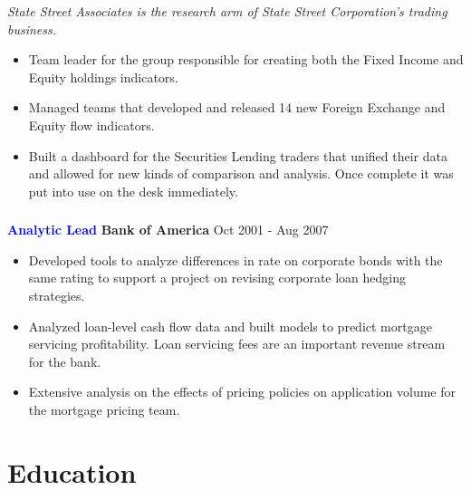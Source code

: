 \documentclass[10pt, letterpaper]{article} %
\providecommand{\tightlist}{%
  \setlength{\itemsep}{0pt}\setlength{\parskip}{0pt}}
\begin{document}
{{\vspace{-4pt}
{\hspace{0.1in} \footnotesize \emph{State Street Associates is the research arm of State Street Corporation's trading business.}}

\vspace{-8pt}

  \begin{itemize}
  \tightlist
  \item Team leader for the group responsible 
    for creating both the Fixed Income and Equity holdings indicators.
  \item Managed teams that developed and released 14 new Foreign Exchange and    Equity flow indicators.
  \item Built a
  dashboard for the Securities Lending traders that unified their data and
  allowed for new kinds of comparison and analysis.
   Once complete it was put into use on the desk immediately.    
  \end{itemize}

\vspace{-20pt}
\hypertarget{bofa}{\subsubsection{}\label{bofa}}
\textbf {\textcolor{blue}{Analytic Lead}} \hfill  
 \textbf{Bank of America} \hfill 
Oct 2001 -  Aug 2007

  \begin{itemize}
  \tightlist
  \item Developed tools to analyze differences in rate on corporate bonds with the same rating to support a project on revising corporate loan hedging strategies.

  \item Analyzed loan-level cash flow data and built models to predict     mortgage servicing profitability. Loan servicing fees are an important revenue stream for the bank.
  
  \item Extensive analysis on the effects of pricing policies on application volume for the mortgage pricing team.
  \end{itemize}


\hypertarget{education-and-activities}{
\section{\texorpdfstring{{\textbf{Education}}}{Education}}\label{education-and-activities}}

}}
\end{document}
